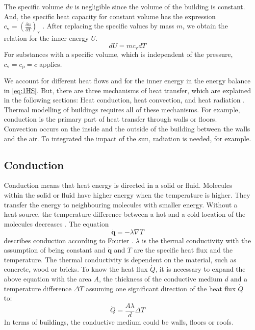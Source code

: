     The specific volume $dv$ is negligible since the volume of the building is constant. And, the specific heat capacity for constant volume has the expression $c_\text{v} = (\frac{\partial u}{\partial T})_\text{v}$ \cite{Baehr.2016b}. After replacing the specific values by mass $m$, we obtain the relation for the inner energy $U$. 
        \begin{equation}
        \label{eq:innerEnergy}
        d U = m c_\text{v} d T
    \end{equation}
    For substances with a specific volume, which is independent of the pressure, $c_\text{v}=c_\text{p}=c$ applies.\newline
    
    We account for different heat flows and for the inner energy in the energy balance in \autoref{eq:1HS}.
    But, there are three mechanisms of heat transfer, which are explained in the following sections: Heat conduction, heat convection, and heat radiation \cite{.2013}. Thermal modelling of buildings requires all of these mechanisms. For example, conduction is the primary part of heat transfer through walls or floors. Convection occurs on the inside and the outside of the building between the walls and the air. To integrated the impact of the sun, radiation is needed, for example.

\subsection{Conduction}
\label{subsection:conduction}

    Conduction means that heat energy is directed in a solid or fluid. Molecules within the solid or fluid have higher energy when the temperature is higher. They transfer the energy to neighbouring molecules with smaller energy. Without a heat source, the temperature difference between a hot and a cold location of the molecules decreases \cite{Kuchling.2007}.
    \newline The equation
    \begin{equation}
    \label{eq:fourier}
        \dot{\textbf{q}} = - \lambda \nabla T
    \end{equation}
    describes conduction according to Fourier \cite{.2013}. $\lambda$ is  the thermal conductivity with the assumption of being constant and $\dot{\textbf{q}}$ and $T$ are the specific heat flux and the temperature. The thermal conductivity is dependent on the material, such as concrete, wood or bricks. 
    \newline
    To know the heat flux $\dot{Q}$, it is necessary to expand the above equation with the area $A$, the thickness of the conductive medium $d$ and a temperature difference $\Delta T$  assuming one significant direction of the heat flux $\dot{Q}$ to:
    \begin{equation}
    \label{eq:conduction1}
        \dot{Q} = \frac{A\lambda}{d} \Delta T
    \end{equation}
    In terms of buildings, the conductive medium could be walls, floors or roofs.

